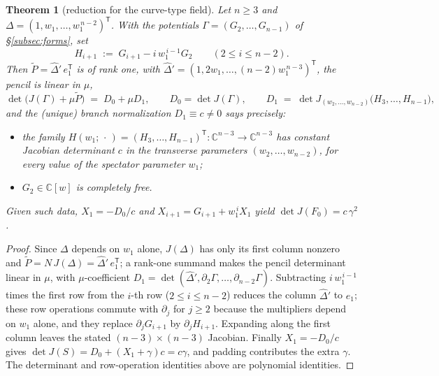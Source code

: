 \documentclass[11pt]{article}
\numberwithin{equation}{section}
\theoremstyle{plain}
\newtheorem{theorem}{Theorem}[section]
\theoremstyle{definition}
\theoremstyle{remark}
\newcommand{\C}{\mathbb{C}}
\begin{document}
\begin{theorem}[reduction for the curve-type field]\label{thm:curvered}
Let $n\ge3$ and $\Delta=(1,w_1,\dots,w_1^{\,n-2})^{\mathsf T}$. With the
potentials $\Gamma=(G_2,\dots,G_{n-1})$ of \S\ref{subsec:forms}, set
\[
H_{i+1}\;:=\;G_{i+1}-i\,w_1^{\,i-1}G_2\qquad(2\le i\le n-2).
\]
Then $\widetilde P=\widehat\Delta{}'\,e_1^{\mathsf T}$ is of rank one, with
$\widehat\Delta{}'=(1,2w_1,\dots,(n-2)w_1^{\,n-3})^{\mathsf T}$, the pencil
is linear in $\mu$,
\[
\det\bigl(J(\Gamma)+\mu\widetilde P\bigr)\;=\;D_0+\mu D_1,
\qquad
D_0=\det J(\Gamma),
\qquad
D_1\;=\;\det J_{(w_2,\dots,w_{n-2})}\bigl(H_3,\dots,H_{n-1}\bigr),
\]
and the (unique) branch normalization $D_1\equiv c\neq0$ says precisely:
\begin{itemize}
\item[(i)] the family
$H(w_1;\,\cdot\,)=(H_3,\dots,H_{n-1})^{\mathsf T}\colon\C^{n-3}\to\C^{n-3}$ has constant
Jacobian determinant $c$ in the transverse parameters $(w_2,\dots,w_{n-2})$,
for every value of the spectator parameter $w_1$;
\item[(ii)] $G_2\in\C[w]$ is completely free.
\end{itemize}
Given such data, $X_1=-D_0/c$ and $X_{i+1}=G_{i+1}+w_1^{\,i}X_1$ yield
$\det J(F_0)=c\,\gamma^2$.
\end{theorem}

\begin{proof}
Since $\Delta$ depends on $w_1$ alone, $J(\Delta)$ has only its first column
nonzero and $\widetilde P=N\,J(\Delta)=\widehat\Delta{}'\,e_1^{\mathsf T}$;
a rank-one summand makes the pencil determinant linear
in $\mu$, with $\mu$-coefficient $D_1=\det(\widehat\Delta{}',\partial_2\Gamma,\dots,
\partial_{n-2}\Gamma)$. Subtracting $i\,w_1^{\,i-1}$ times the first row from
the $i$-th row ($2\le i\le n-2$) reduces the column $\widehat\Delta{}'$ to $e_1$; these row
operations commute with $\partial_j$ for $j\ge2$ because the multipliers
depend on $w_1$ alone, and they replace $\partial_jG_{i+1}$ by
$\partial_jH_{i+1}$. Expanding along the first column leaves the stated
$(n-3)\times(n-3)$ Jacobian. Finally $X_1=-D_0/c$ gives
$\det J(S)=D_0+(X_1+\gamma)c=c\gamma$, and padding contributes the extra
$\gamma$. The determinant and row-operation identities above are polynomial identities.
\end{proof}
\end{document}
